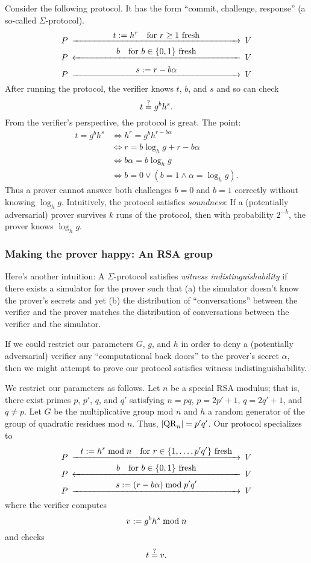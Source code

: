 Consider the following protocol. It has the form ``commit,
challenge, response'' (a so-called $\Sigma$-protocol).
\[
	\minCDarrowwidth200pt
	\begin{CD}
	P	@>{\displaystyle t \defeq h^r	\quad\text{for $r \ge 1$ fresh}}>>	V \\
	P	@<{\displaystyle b	\quad\text{for $b \in \sset{0, 1}$ fresh}}<<	V \\
	P	@>{\displaystyle s \defeq r - b\alpha}>>	V
	\end{CD}
\]
After running the protocol, the verifier knows $t$, $b$, and $s$
and so can check
$$
	t \mathrel{\overset{\mathrm{?}}{=}} g^b h^s.
$$
From the verifier's perspective, the protocol is great. The
point:
\begin{align*}
	t = g^b h^s &\iff h^r = g^b h^{r - b\alpha} \\
	&\iff r = b \log_h g + r - b\alpha \\
	&\iff b\alpha = b \log_h g \\
	&\iff b = 0 \lor (b = 1 \land \alpha = \log_h g).
\end{align*}
Thus a prover cannot answer both challenges $b = 0$ and $b = 1$
correctly without knowing $\log_h g$. Intuitively, the protocol
satisfies \emph{soundness}: If a (potentially adversarial) prover
survives $k$ runs of the protocol, then with probability $2^{-k}$,
the prover knows $\log_h g$.

\subsubsection{Making the prover happy: An RSA group}

Here's another intuition: A $\Sigma$-protocol satisfies \emph{witness
indistinguishability} if there exists a simulator for the
prover such that (a) the simulator doesn't know the prover's
secrets and yet (b) the distribution of ``conversations''
between the verifier and the prover matches the distribution
of conversations between the verifier and the simulator.

If we could restrict our parameters $G$, $g$, and $h$ in order to
deny a (potentially adversarial) verifier any ``computational
back doors'' to the prover's secret $\alpha$, then we might attempt to
prove our protocol satisfies witness
indistinguishability.

We restrict our parameters as follows.
Let $n$ be a special RSA modulus; that is,
there exist primes $p$, $p'$, $q$, and $q'$ satisfying
$n = pq$, $p = 2p' + 1$, $q = 2q' + 1$, and $q \not= p$.
Let $G$ be the multiplicative group mod $n$
and $h$ a random generator of the group of quadratic
residues mod $n$.
Thus, $\lvert{\mathrm{QR}_n}\rvert = p'q'$. Our protocol specializes to
\[
	\minCDarrowwidth200pt
	\begin{CD}
	P	@>{\displaystyle t \defeq h^r \bmod n	\quad\text{for $r \in \sset{1, \ldots, p'q'}$ fresh}}>>	V \\
	P	@<{\displaystyle b	\quad\text{for $b \in \sset{0, 1}$ fresh}}<<	V \\
	P	@>{\displaystyle s \defeq (r - b\alpha) \bmod p'q'}>>	V
	\end{CD}
\]
where the verifier computes
\[
	v \mathrel{:=} g^b h^s \bmod n
\]
and checks
\[
	t \mathrel{\overset{\mathrm{?}}{=}} v.
\]

